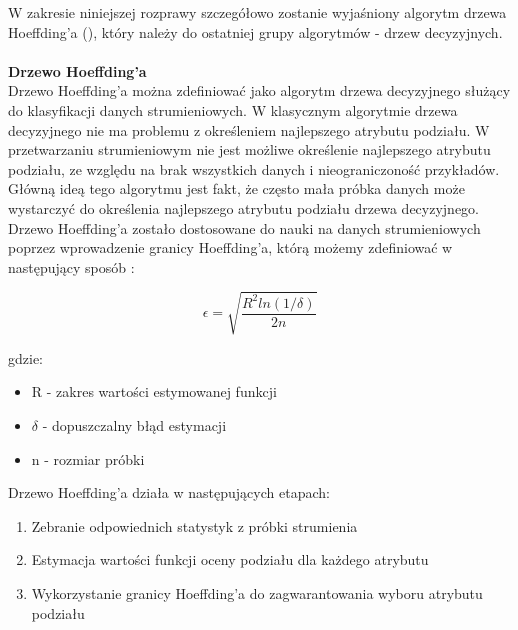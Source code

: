 \noindent W zakresie niniejszej rozprawy szczegółowo zostanie wyjaśniony algorytm drzewa Hoeffding'a (), który należy do ostatniej grupy algorytmów - drzew decyzyjnych.\\\\
\textbf{Drzewo Hoeffding'a}\\

Drzewo Hoeffding'a można zdefiniować jako algorytm drzewa decyzyjnego służący do klasyfikacji danych strumieniowych. W klasycznym algorytmie drzewa decyzyjnego nie ma problemu z określeniem najlepszego atrybutu podziału. W przetwarzaniu strumieniowym nie jest możliwe określenie najlepszego atrybutu podziału, ze względu na brak wszystkich danych i nieograniczoność przykładów. Główną ideą tego algorytmu jest fakt, że często mała próbka danych może wystarczyć do określenia najlepszego atrybutu podziału drzewa decyzyjnego. Drzewo Hoeffding'a zostało dostosowane do nauki na danych strumieniowych poprzez wprowadzenie granicy Hoeffding'a, którą możemy zdefiniować w następujący sposób \cite{BrzezPhd2015}:

\begin{equation}
    \epsilon = \sqrt{\frac{R^2ln(1/\delta)}{2n}}
\end{equation}

\noindent gdzie:

\begin{itemize}
    \item R - zakres wartości estymowanej funkcji
    \item $\delta$ - dopuszczalny błąd estymacji
    \item n - rozmiar próbki
\end{itemize}

\noindent Drzewo Hoeffding'a działa w następujących etapach: 

\begin{enumerate}
    \item Zebranie odpowiednich statystyk z próbki strumienia
    \item Estymacja wartości funkcji oceny podziału dla każdego atrybutu
    \item Wykorzystanie granicy Hoeffding'a do zagwarantowania wyboru atrybutu podziału
\end{enumerate}

\newpage

